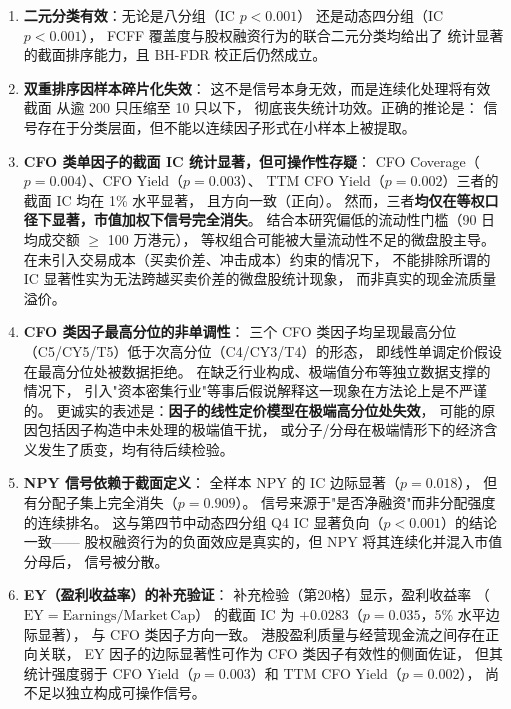 \documentclass[a4paper,10pt]{article}
\begin{document}
\begin{enumerate}[leftmargin=2em]
    \item \textbf{二元分类有效}：无论是八分组（IC $p<0.001$）
    还是动态四分组（IC $p<0.001$），
    FCFF 覆盖度与股权融资行为的联合二元分类均给出了
    统计显著的截面排序能力，且 BH-FDR 校正后仍然成立。

    \item \textbf{双重排序因样本碎片化失效}：
    这不是信号本身无效，而是连续化处理将有效截面
    从逾 200 只压缩至 10 只以下，
    彻底丧失统计功效。正确的推论是：
    信号存在于分类层面，但不能以连续因子形式在小样本上被提取。

    \item \textbf{CFO 类单因子的截面 IC 统计显著，但可操作性存疑}：
    CFO Coverage（$p=0.004$）、CFO Yield（$p=0.003$）、
    TTM CFO Yield（$p=0.002$）三者的截面 IC 均在 1\% 水平显著，
    且方向一致（正向）。
    然而，三者\textbf{均仅在等权口径下显著，市值加权下信号完全消失}。
    结合本研究偏低的流动性门槛（90 日均成交额 $\geq$ 100 万港元），
    等权组合可能被大量流动性不足的微盘股主导。
    在未引入交易成本（买卖价差、冲击成本）约束的情况下，
    不能排除所谓的 IC 显著性实为无法跨越买卖价差的微盘股统计现象，
    而非真实的现金流质量溢价。

    \item \textbf{CFO 类因子最高分位的非单调性}：
    三个 CFO 类因子均呈现最高分位（C5/CY5/T5）低于次高分位（C4/CY3/T4）的形态，
    即线性单调定价假设在最高分位处被数据拒绝。
    在缺乏行业构成、极端值分布等独立数据支撑的情况下，
    引入"资本密集行业"等事后假说解释这一现象在方法论上是不严谨的。
    更诚实的表述是：\textbf{因子的线性定价模型在极端高分位处失效}，
    可能的原因包括因子构造中未处理的极端值干扰，
    或分子/分母在极端情形下的经济含义发生了质变，均有待后续检验。

    \item \textbf{NPY 信号依赖于截面定义}：
    全样本 NPY 的 IC 边际显著（$p=0.018$），
    但有分配子集上完全消失（$p=0.909$）。
    信号来源于"是否净融资"而非分配强度的连续排名。
    这与第四节中动态四分组 Q4 IC 显著负向（$p<0.001$）的结论一致——
    股权融资行为的负面效应是真实的，但 NPY 将其连续化并混入市值分母后，
    信号被分散。

    \item \textbf{EY（盈利收益率）的补充验证}：
    补充检验（第20格）显示，盈利收益率
    （$\mathrm{EY} = \mathrm{Earnings} / \mathrm{Market\,Cap}$）
    的截面 IC 为 $+0.0283$（$p=0.035$，5\% 水平边际显著），
    与 CFO 类因子方向一致。
    港股盈利质量与经营现金流之间存在正向关联，
    EY 因子的边际显著性可作为 CFO 类因子有效性的侧面佐证，
    但其统计强度弱于 CFO Yield（$p=0.003$）和 TTM CFO Yield（$p=0.002$），
    尚不足以独立构成可操作信号。
\end{enumerate}
\end{document}
